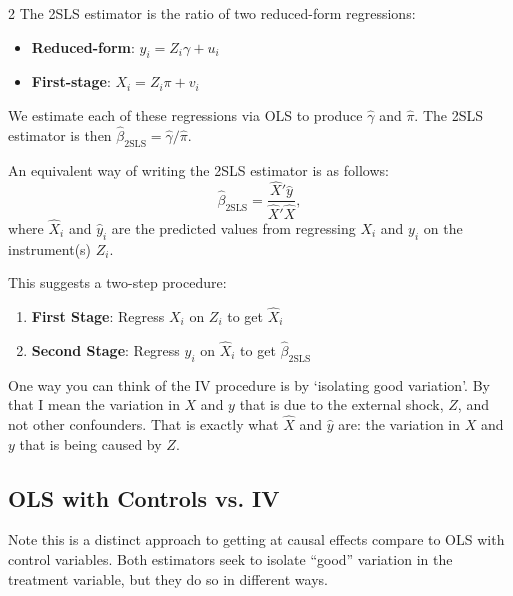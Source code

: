 \documentclass[12pt]{article}
\begin{document}
\begin{multicols}{2}
The 2SLS estimator is the ratio of two reduced-form regressions:
\begin{itemize}
  \item \textbf{Reduced-form}: $y_i = Z_i \gamma + u_i$
  \item \textbf{First-stage}: $X_i = Z_i \pi + v_i$
\end{itemize}
We estimate each of these regressions via OLS to produce $\hat{\gamma}$ and $\hat{\pi}$.
The 2SLS estimator is then $\hat{\beta}_{\text{2SLS}} = \hat{\gamma} / \hat{\pi}$.


An equivalent way of writing the 2SLS estimator is as follows:
$$
  \hat{\beta}_{\text{2SLS}} = \frac{\hat{X}' \hat{y}}{\hat{X}' \hat{X}},
$$
where $\hat{X}_i$ and $\hat{y}_i$ are the predicted values from regressing $X_i$ and $y_i$ on the instrument(s) $Z_i$.

This suggests a two-step procedure:
\begin{enumerate}
  \item \textbf{First Stage}: Regress $X_i$ on $Z_i$ to get $\hat{X}_i$
  \item \textbf{Second Stage}: Regress $y_i$ on $\hat{X}_i$ to get $\hat{\beta}_{\text{2SLS}}$
\end{enumerate}

One way you can think of the IV procedure is by `isolating good variation'. 
By that I mean the variation in $X$ and $y$ that is due to the external shock, $Z$, and not other confounders.
That is exactly what $\hat{X}$ and $\hat{y}$ are: the variation in $X$ and $y$ that is being caused by $Z$.

\subsection*{OLS with Controls vs. IV}

Note this is a distinct approach to getting at causal effects compare to OLS with control variables. 
Both estimators seek to isolate ``good'' variation in the treatment variable, but they do so in different ways.


\end{multicols}
\end{document}
